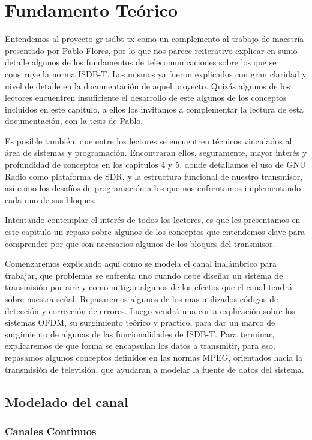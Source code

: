 \chapter{Fundamento Teórico}

Entendemos al proyecto gr-isdbt-tx como un complemento al trabajo de maestría presentado por Pablo Flores, por lo que nos parece reiterativo explicar en sumo detalle algunos de los fundamentos de telecomunicaciones sobre los que se construye la norma ISDB-T. Los mismos ya fueron explicados con gran claridad y nivel de detalle en la documentación de aquel proyecto. Quizás algunos de los lectores encuentren insuficiente el desarrollo de este algunos de los conceptos incluidos en este capitulo, a ellos los invitamos a complementar la lectura de esta documentación, con la tesis de Pablo.

Es posible también, que entre los lectores se encuentren técnicos vinculados al área de sistemas y programación.  Encontraran ellos, seguramente, mayor interés y profundidad de conceptos en los capítulos 4 y 5, donde detallamos el uso de GNU Radio como plataforma de SDR, y la estructura funcional de nuestro transmisor, así como los desafíos de programación a los que nos enfrentamos implementando cada uno de sus bloques. 

Intentando contemplar el interés de todos los lectores, es que les presentamos en este capitulo un repaso sobre algunos de los conceptos que entendemos clave para comprender por que son necesarios algunos de los bloques del transmisor. 

Comenzaremos explicando aquí como se modela el canal inalámbrico para trabajar, que problemas se enfrenta uno cuando debe diseñar un sistema de transmisión por aire y como mitigar algunos de los efectos que el canal tendrá sobre nuestra señal. Repasaremos algunos de los mas utilizados códigos de detección y corrección de errores. Luego vendrá una corta explicación sobre los sistemas OFDM, su surgimiento teórico y practico, para dar un marco de surgimiento de algunas de las funcionalidades de ISDB-T. Para terminar, explicaremos de que forma se encapsulan los datos a transmitir, para eso, repasamos algunos conceptos definidos en las normas MPEG, orientados hacia la transmisión de televisión, que ayudaran a modelar la fuente de datos del sistema.  

\section{Modelado del canal}
	\subsection{Canales Continuos}
